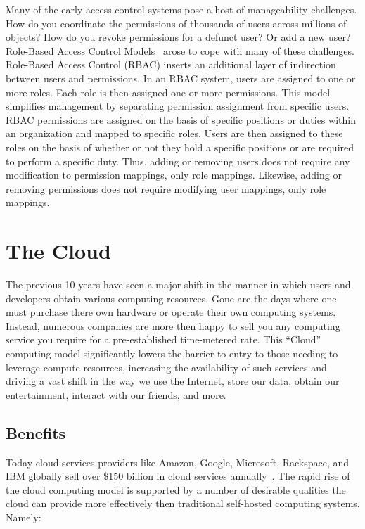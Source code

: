 Many of the early access control systems pose a host of manageability
challenges. How do you coordinate the permissions of thousands of
users across millions of objects? How do you revoke permissions for a
defunct user? Or add a new user?  Role-Based Access Control
Models~\cite{sandhu1996} arose to cope with many of these challenges.
Role-Based Access Control (RBAC) inserts an additional layer of
indirection between users and permissions. In an RBAC system, users
are assigned to one or more roles. Each role is then assigned one or
more permissions. This model simplifies management by separating
permission assignment from specific users. RBAC permissions are
assigned on the basis of specific positions or duties within an
organization and mapped to specific roles. Users are then assigned to
these roles on the basis of whether or not they hold a specific
positions or are required to perform a specific duty. Thus, adding or
removing users does not require any modification to permission
mappings, only role mappings. Likewise, adding or removing permissions
does not require modifying user mappings, only role mappings.

\section{The Cloud}
\label{chap:background:cloud}

The previous 10 years have seen a major shift in the manner in which
users and developers obtain various computing resources. Gone are the
days where one must purchase there own hardware or operate their own
computing systems. Instead, numerous companies are more then happy to
sell you any computing service you require for a pre-established
time-metered rate. This ``Cloud'' computing model significantly lowers
the barrier to entry to those needing to leverage compute resources,
increasing the availability of such services and driving a vast shift
in the way we use the Internet, store our data, obtain our
entertainment, interact with our friends, and more.

\subsection{Benefits}

Today cloud-services providers like Amazon, Google, Microsoft,
Rackspace, and IBM globally sell over \$150 billion in cloud services
annually~\cite{flood2013}. The rapid rise of the cloud computing model
is supported by a number of desirable qualities the cloud can provide
more effectively then traditional self-hosted computing
systems. Namely:

